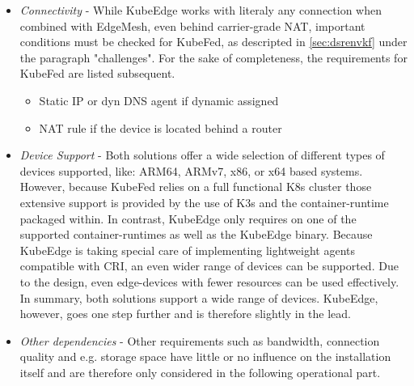 \documentclass[MSC,Master,english]{twbook}%
\begin{document}
\begin{itemize}
    \item \textit{Connectivity} - While KubeEdge works with literaly any connection when combined with EdgeMesh, even behind carrier-grade \ac{NAT}\cite{cg-nat}, important conditions must be checked for KubeFed, as descripted in \autoref{sec:dsrenvkf} under the paragraph "challenges". For the sake of completeness, the requirements for KubeFed are listed subsequent.
    \begin{itemize}
        \item Static \ac{IP} or dyn \ac{DNS} agent if dynamic assigned
        \item \ac{NAT} rule if the device is located behind a router
    \end{itemize}
    \item \textit{Device Support} - Both solutions offer a wide selection of different types of devices supported, like: ARM64, ARMv7, x86, or x64 based systems. However, because \ac{KubeFed} relies on a full functional \ac{K8s} cluster those extensive support is provided by the use of K3s and the container-runtime packaged within. In contrast, KubeEdge only requires on one of the supported container-runtimes as well as the KubeEdge binary. Because KubeEdge is taking special care of implementing lightweight agents compatible with \ac{CRI}\cite{k8scri}\cite{ke-cri-gh}, an even wider range of devices can be supported. Due to the design, even edge-devices with fewer resources can be used effectively. In summary, both solutions support a wide range of devices. KubeEdge, however, goes one step further and is therefore slightly in the lead.
    \item \textit{Other dependencies} - Other requirements such as bandwidth, connection quality and e.g. storage space have little or no influence on the installation itself and are therefore only considered in the following operational part.
\end{itemize}
\end{document}
